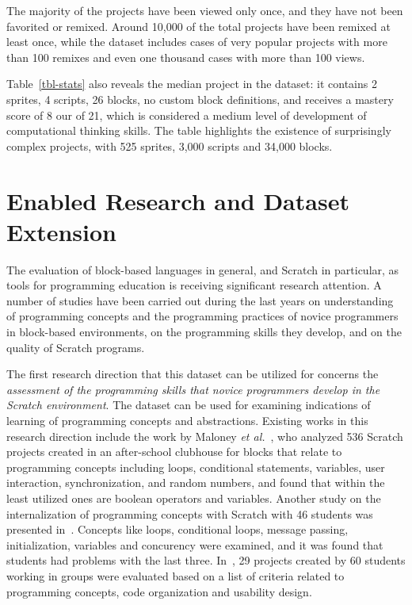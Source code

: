 \documentclass[10pt, conference]{IEEEtran}
\newcommand{\fenia}[1]{\emph{\color{blue}Fenia says: #1}}
\begin{document}
The majority of the projects have been viewed only once, and they have not been favorited or remixed.
Around 10,000 of the total projects have been remixed at least once, while the dataset includes cases of very popular projects with more than 100 remixes and even one thousand cases with more than 100 views. 

Table~\ref{tbl-stats} also reveals the median project in the dataset: it contains 2 sprites, 4 scripts, 26 blocks, no custom block definitions, and receives a mastery score of 8 our of 21, which is considered a medium level of development of computational thinking skills. The table highlights the existence of surprisingly complex projects, with 525 sprites, 3,000 scripts and 34,000 blocks.

\section{Enabled Research and Dataset Extension}


The evaluation of block-based languages in general, and Scratch in particular, as tools for programming education is receiving significant research attention.
A number of studies have been carried out during the last years on understanding of programming concepts and the programming practices of novice programmers in block-based environments, on the programming skills they develop, and on the quality of Scratch programs.

The first research direction that this dataset can be utilized for concerns the \textit{assessment of the programming skills that novice programmers develop in the Scratch environment}.
The dataset can be used for examining indications of learning of programming concepts and abstractions.
Existing works in this research direction include the work by Maloney \emph{et al.}~\cite{Maloney_2008}, who analyzed 536 Scratch projects created in an after-school clubhouse for blocks that relate to programming concepts including loops, conditional statements, variables, user interaction, synchronization, and random numbers, and found that within the least utilized ones are boolean operators and variables.
Another study on the internalization of programming concepts with Scratch with 46 students was presented in~\cite{meerbaum-salant_learning_2010}.
Concepts like loops, conditional loops, message passing, initialization, variables and concurency were examined, and it was found that students had problems with the last three. In~\cite{wilson_evaluation_2012}, 29 projects created by 60 students working in groups were evaluated based on a list of criteria related to programming concepts, code organization and usability design.
\end{document}
